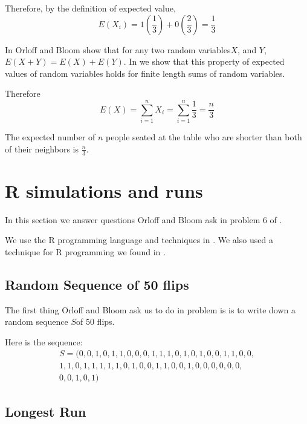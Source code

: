 \documentclass[a4paper,11pt]{article}
\begin{document}
Therefore, by the definition of expected value,
\begin{equation}
  E\left( X_{i} \right) = 1 \left( \frac{1}{3} \right)
    + 0 \left( \frac{2}{3} \right) = \frac{1}{3}
\end{equation}

In \cite{reading4b} Orloff and Bloom show that for any two random
variables$X$, and $Y$, $E \left( X + Y \right) = E \left( X \right) +
E \left(Y \right)$.  In \cite{hannySlides4} we show that this property
of expected values of random variables holds for finite length sums
of random variables.

Therefore
\begin{equation}
 E(X) = \sum_{i=1}^{n} X_{i} = \sum_{i=1}^{n} \frac{1}{3} = \frac{n}{3}
\end{equation}

The expected number of $n$ people seated at the table who are shorter
than both of their neighbors is $\frac{n}{3}$.


\section{R simulations and runs}
In this section we answer questions Orloff and Bloom ask in problem 6
of \cite{prob2Set}.

We use the R programming language and techniques in \cite{reading4R}.
We also used a technique for R programming we found in \cite{rleHint}.

\subsection{Random Sequence of 50 flips}
The first thing Orloff and Bloom ask us to do in problem is is to
write down a random sequence $S$of 50 flips.

Here is the sequence:
\begin{equation}
\begin{split}
S= (0, 0, 1, 0, 1, 1, 0, 0, 0, 1, 1, 1, 0, 1, 0, 1, 0, 0, 1, 1, 0, 0, \\
1, 1, 0, 1, 1, 1, 1, 1, 0, 1, 0, 0, 1, 1, 0, 0, 1, 0, 0, 0, 0, 0, 0, \\
0, 0, 1, 0, 1)
\end{split}
\end{equation}

\subsection{Longest Run}
\end{document}
